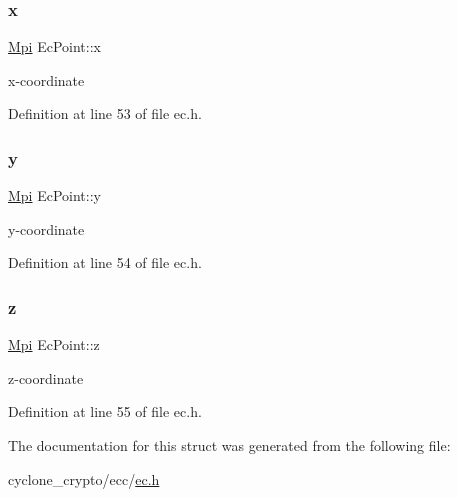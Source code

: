 \subsubsection{\texorpdfstring{x}{x}}
{\footnotesize\ttfamily \hyperlink{structMpi}{Mpi} Ec\+Point\+::x}



x-\/coordinate 



Definition at line 53 of file ec.\+h.

\mbox{\label{structEcPoint_a2102dff813849bd0eaed8a1a5e64ec1f}} 
\subsubsection{\texorpdfstring{y}{y}}
{\footnotesize\ttfamily \hyperlink{structMpi}{Mpi} Ec\+Point\+::y}



y-\/coordinate 



Definition at line 54 of file ec.\+h.

\mbox{\label{structEcPoint_ac53a6ff4888f818509027e37004635f5}} 
\subsubsection{\texorpdfstring{z}{z}}
{\footnotesize\ttfamily \hyperlink{structMpi}{Mpi} Ec\+Point\+::z}



z-\/coordinate 



Definition at line 55 of file ec.\+h.



The documentation for this struct was generated from the following file\+:\begin{DoxyCompactItemize}
\item 
cyclone\+\_\+crypto/ecc/\hyperlink{ec_8h}{ec.\+h}\end{DoxyCompactItemize}
